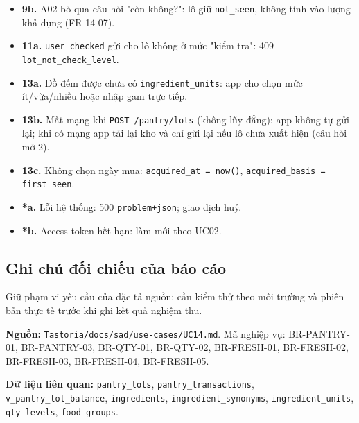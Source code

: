 \begin{itemize}
\item \textbf{9b.} A02 bỏ qua câu hỏi "còn không?": lô giữ {\small\texttt{not\_\allowbreak{}\allowbreak{}seen}}, không tính vào lượng khả dụng (FR-\allowbreak{}14-\allowbreak{}07).
\item \textbf{11a.} {\small\texttt{user\_\allowbreak{}\allowbreak{}checked}} gửi cho lô không ở mức "kiểm tra": 409 {\small\texttt{lot\_\allowbreak{}\allowbreak{}not\_\allowbreak{}\allowbreak{}check\_\allowbreak{}\allowbreak{}level}}.
\item \textbf{13a.} Đồ đếm được chưa có {\small\texttt{ingredient\_\allowbreak{}\allowbreak{}units}}: app cho chọn mức ít/\allowbreak{}vừa/\allowbreak{}nhiều hoặc nhập gam trực tiếp.
\item \textbf{13b.} Mất mạng khi {\small\texttt{POST /\allowbreak{}\allowbreak{}pantry/\allowbreak{}\allowbreak{}lots}} (không lũy đẳng): app không tự gửi lại; khi có mạng app tải lại kho và chỉ gửi lại nếu lô chưa xuất hiện (câu hỏi mở 2).
\item \textbf{13c.} Không chọn ngày mua: {\small\texttt{acquired\_\allowbreak{}\allowbreak{}at = now()}}, {\small\texttt{acquired\_\allowbreak{}\allowbreak{}basis = first\_\allowbreak{}\allowbreak{}seen}}.
\item \textbf{*a.} Lỗi hệ thống: 500 {\small\texttt{problem+json}}; giao dịch huỷ.
\item \textbf{*b.} Access token hết hạn: làm mới theo UC02.
\end{itemize}
\subsection{Ghi chú đối chiếu của báo cáo}
Giữ phạm vi yêu cầu của đặc tả nguồn; cần kiểm thử theo môi trường và phiên bản thực tế trước khi ghi kết quả nghiệm thu.

\textbf{Nguồn:} {\small\texttt{Tastoria/\allowbreak{}\allowbreak{}docs/\allowbreak{}\allowbreak{}sad/\allowbreak{}\allowbreak{}use-\allowbreak{}cases/\allowbreak{}\allowbreak{}UC14.\allowbreak{}md}}. Mã nghiệp vụ: BR-\allowbreak{}PANTRY-\allowbreak{}01, BR-\allowbreak{}PANTRY-\allowbreak{}03, BR-\allowbreak{}QTY-\allowbreak{}01, BR-\allowbreak{}QTY-\allowbreak{}02, BR-\allowbreak{}FRESH-\allowbreak{}01, BR-\allowbreak{}FRESH-\allowbreak{}02, BR-\allowbreak{}FRESH-\allowbreak{}03, BR-\allowbreak{}FRESH-\allowbreak{}04, BR-\allowbreak{}FRESH-\allowbreak{}05.

\textbf{Dữ liệu liên quan:} {\small\texttt{pantry\_\allowbreak{}\allowbreak{}lots}}, {\small\texttt{pantry\_\allowbreak{}\allowbreak{}transactions}}, {\small\texttt{v\_\allowbreak{}\allowbreak{}pantry\_\allowbreak{}\allowbreak{}lot\_\allowbreak{}\allowbreak{}balance}}, {\small\texttt{ingredients}}, {\small\texttt{ingredient\_\allowbreak{}\allowbreak{}synonyms}}, {\small\texttt{ingredient\_\allowbreak{}\allowbreak{}units}}, {\small\texttt{qty\_\allowbreak{}\allowbreak{}levels}}, {\small\texttt{food\_\allowbreak{}\allowbreak{}groups}}.

